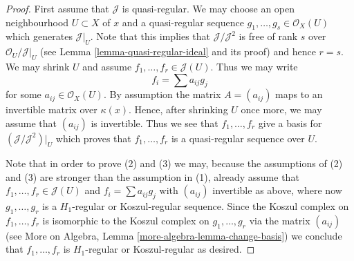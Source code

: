 \documentclass[10pt,a4paper]{amsart}
\theoremstyle{plain}
\theoremstyle{definition}
\theoremstyle{remark}
\numberwithin{equation}{subsection}
\begin{document}
\begin{proof}
First assume that $\mathcal{J}$ is quasi-regular. We may choose an
open neighbourhood $U \subset X$ of $x$ and a quasi-regular sequence
$g_1, \ldots, g_s \in \mathcal{O}_X(U)$ which generates $\mathcal{J}|_U$.
Note that this implies that $\mathcal{J}/\mathcal{J}^2$ is free of
rank $s$ over $\mathcal{O}_U/\mathcal{J}|_U$ (see
Lemma \ref{lemma-quasi-regular-ideal}
and its proof) and hence $r = s$.
We may shrink $U$ and assume $f_1, \ldots, f_r \in \mathcal{J}(U)$.
Thus we may write
$$
f_i = \sum a_{ij} g_j
$$
for some $a_{ij} \in \mathcal{O}_X(U)$. By assumption the matrix
$A = (a_{ij})$ maps to an invertible matrix over $\kappa(x)$.
Hence, after shrinking $U$ once more, we may assume that $(a_{ij})$
is invertible. Thus we see that $f_1, \ldots, f_r$ give a basis
for $(\mathcal{J}/\mathcal{J}^2)|_U$ which proves that $f_1, \ldots, f_r$
is a quasi-regular sequence over $U$.

\medskip\noindent
Note that in order to prove (2) and (3) we may, because the assumptions
of (2) and (3) are stronger than the assumption in (1), already assume that
$f_1, \ldots, f_r \in \mathcal{J}(U)$ and $f_i = \sum a_{ij}g_j$
with $(a_{ij})$ invertible as above, where now $g_1, \ldots, g_r$
is a $H_1$-regular or Koszul-regular sequence. Since the Koszul complex
on $f_1, \ldots, f_r$ is isomorphic to the Koszul complex on
$g_1, \ldots, g_r$ via the matrix $(a_{ij})$ (see
More on Algebra, Lemma \ref{more-algebra-lemma-change-basis})
we conclude that $f_1, \ldots, f_r$ is $H_1$-regular or Koszul-regular
as desired.
\end{proof}
\end{document}
